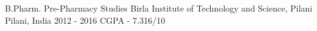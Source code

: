 

\begin{cventries}

  \cventry
    {B.Pharm. Pre-Pharmacy Studies} %
    {Birla Institute of Technology and Science, Pilani} %
    {Pilani, India} %
    {2012 - 2016} %
    {CGPA - 7.316/10}
    {
      \begin{cvitems} %
      \end{cvitems}
    }

\end{cventries}
